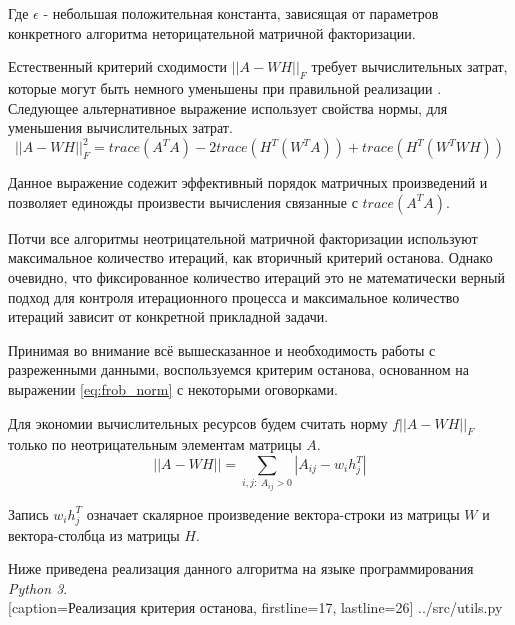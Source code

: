 Где $\epsilon$ - небольшая положительная константа, зависящая от параметров
конкретного алгоритма неторицательной матричной факторизации.

Естественный критерий сходимости $||A - WH||_F$ требует вычислительных затрат,
которые могут быть немного уменьшены при правильной реализации \cite{berry}.
Следующее альтернативное выражение использует свойства нормы, для уменьшения вычислительных затрат.
\begin{equation*}
  ||A - WH||^2_F = trace(A^T A) - 2 trace(H^T (W^T A)) + trace(H^T (W^T W H))
\end{equation*}

Данное выражение содежит эффективный порядок матричных произведений и позволяет
единожды произвести вычисления связанные с $trace(A^T A)$.

Потчи все алгоритмы неотрицательной матричной факторизации используют
максимальное количество итераций, как вторичный критерий останова.
Однако очевидно, что фиксированное количество итераций это не математически верный
подход для контроля итерационного процесса и максимальное количество итераций зависит от конкретной прикладной задачи.

Принимая во внимание всё вышесказанное и необходимость работы с разреженными данными,
воспользуемся критерим останова, основанном на выражении \ref{eq:frob_norm} с некоторыми оговорками.

Для экономии вычислительных ресурсов будем считать норму $f|| A - WH ||_F$ только по неотрицательным элементам матрицы $A$.
\begin{equation*}
  ||A - WH|| = \sum\limits_{i, j: \ A_{ij} > 0}  | A_{ij} - w_i  h^T_j |
\end{equation*}

Запись $w_i h^T_j$ означает скалярное произведение вектора-строки из матрицы $W$ и вектора-столбца из матрицы $H$.

\newpage

Ниже приведена реализация данного алгоритма на языке программирования \textit{Python 3}.
\\


  [caption=Реализация критерия останова, firstline=17, lastline=26]
  {../src/utils.py} \label{code:als_nnls}
